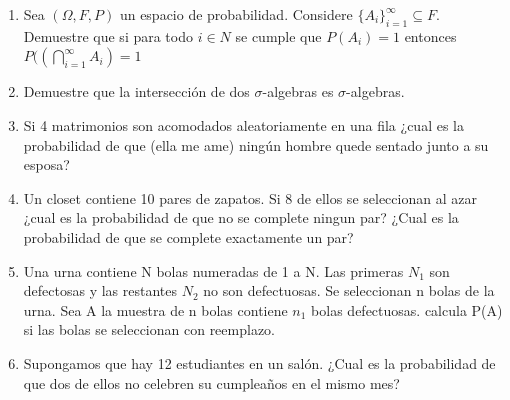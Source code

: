 \documentclass[12pt,a4paper]{report}
\begin{document}
\begin{enumerate}
  \item{
 Sea $(\Omega, F, P)$ un espacio de probabilidad. Considere $\lbrace A_{i} \rbrace_{i=1}^{\infty} \subseteq F$. Demuestre que si para todo $i \in N$ se cumple que $P(A_{i})=1$ entonces $P((\bigcap\limits_{i=1}^{\infty}A_{i})=1$
  }

  \item{
 Demuestre que la intersección de dos $\sigma$-algebras es $\sigma$-algebras.
  }


  \item{
Si 4 matrimonios son acomodados aleatoriamente en una fila ¿cual es la probabilidad de que (ella me ame) ningún hombre quede sentado junto a su esposa?
  }

  \item{
Un closet contiene 10 pares de zapatos. Si 8 de ellos se seleccionan al azar ¿cual es la probabilidad de que no se complete ningun par? ¿Cual es la probabilidad de que se complete exactamente un par?
  }

  \item{
	Una urna contiene N  bolas numeradas de 1 a N. Las primeras $N_{1}$ son defectosas y las restantes $N_{2}$ no son defectuosas. Se seleccionan n bolas de la urna. Sea A la muestra de n bolas contiene $n_{1}$ bolas defectuosas. calcula P(A) si las bolas se seleccionan con reemplazo.
  }

  \item{
	Supongamos que hay 12 estudiantes en un salón. ¿Cual es la probabilidad de que dos de ellos no celebren su cumpleaños en el mismo mes?
  }





\end{enumerate}
\end{document}
